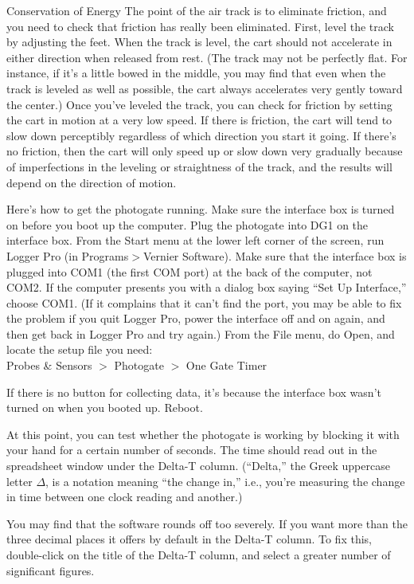 \begin{lab}{Conservation of Energy}
The point of the air track is to eliminate friction, and
you need to check that friction has really been eliminated.
First, level the track by adjusting the feet. When the track is
level, the cart should not accelerate in either direction
when released from rest. (The track may not be perfectly
flat. For instance, if it's a little bowed in the middle, you
may find that even when the track is leveled as well as possible,
the cart always accelerates very gently toward the center.)
Once you've leveled the track, you can check for friction by
setting the cart in motion at a very low speed. If there is friction,
the cart will tend to slow down perceptibly regardless of which
direction you start it going. If there's no friction, then the
cart will only speed up or slow down very gradually because of imperfections
in the leveling or straightness of the track, and the results
will depend on the direction of motion.

Here's how to get the photogate running.
Make sure the interface box is turned on before you
boot up the computer. Plug the photogate into DG1 on the
interface box.
From the Start menu at the lower left corner of the screen,
run Logger Pro (in Programs$>$Vernier Software).
Make sure that the interface box is plugged into COM1 (the first
COM port) at the
back of the computer, not COM2.
If the computer presents you with a dialog box saying ``Set
Up Interface,''  choose COM1.
(If it complains that it can't find the port, you may be able
to fix the problem if you quit Logger Pro, power the interface off
and on again, and then get back in Logger Pro and try again.)
From the File menu, do Open, and locate the setup file you need:\\
   Probes \& Sensors $>$ Photogate $>$ One Gate Timer

If there is no button for collecting data, it's because the
interface box wasn't turned on when you booted up. Reboot.

At this point, you can test whether the photogate is working by
blocking it with your hand for a certain number of seconds. The
time should read out in the spreadsheet window under the Delta-T
column. (``Delta,'' the Greek uppercase letter $\Delta$, is a notation
meaning ``the change in,'' i.e., you're measuring the change in time
between one clock reading and another.)

You may find that the software rounds off too
severely. If you want more
than the three decimal places it offers by default in the
Delta-T column. To fix this, double-click on the title of
the Delta-T column, and select a greater number of
significant figures.   


\end{lab}
